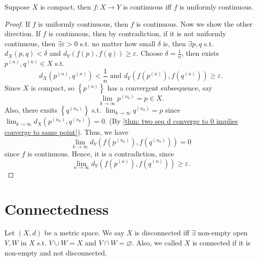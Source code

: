 \begin{theorem}
    Suppose \(X\) is compact, then \(f:X \to Y\) is continuous iff \(f\) is uniformly continuous.   
\end{theorem}
\begin{proof}
    If \(f\) is uniformly continuous, then \(f\) is continuous. Now we show the other direction. If \(f\) is continuous, then by contradiction, if it is not uniformly continuous, then \(\exists \varepsilon > 0\) s.t. no matter how small \(\delta \) is, then \(\exists p, q\) s.t. \(d_X(p, q) < \delta \) and \(d_Y(f(p), f(q)) \ge \varepsilon \). Choose \(\delta = \frac{1}{n}\), then exists \(p^{(n)}, q^{(n)} \in X\) s.t. 
    \[
        d_X \left( p^{(n)}, q^{(n)} \right) < \frac{1}{n} \text{ and } d_Y \left( f \left( p^{(n)}\right), f \left( q^{(n)}  \right)   \right) \ge \varepsilon.  
    \]  Since \(X\) is compact, so \(\left\{ p^{(n)} \right\} \) has a convergent subsequence, say 
    \[
        \lim_{k \to \infty} p^{(n_k)} = p \in X.  
    \] Also, there exsits \(\left\{ q^{(n_k)} \right\} \) s.t. \(\lim_{k \to \infty} q^{(n_k)} = p \) since \(\lim_{k \to \infty} d_X \left( p^{(n_k)}, q^{(n_k)} \right) = 0  \). (By \autoref{thm: two seq d converge to 0 implies converge to same point}). Thus, we have 
    \[
        \lim_{k \to \infty} d_Y \left( f \left( p^{(n_k)} \right) , f \left( q^{(n_k)} \right)  \right) = 0 
    \] since \(f\) is continuous. 
    Hence, it is a contradiction, since
    \[
        \lim_{n \to \infty} d_Y \left( f \left( p^{(n)} \right), f \left( q^{(n)} \right)   \right) \ge \varepsilon. 
    \]
\end{proof}

\section{Connectedness}
\begin{definition} \label{def: disconnected/connected}
    Let \((X, d)\) be a metric space. We say \(X\) is disconnected iff \(\exists \) non-empty open \(V, W\) in \(X\) s.t. \(V \cup W = X\) and \(V \cap W = \varnothing \). Also, we called \(X\) is connected if it is non-empty and not disconnected.       
\end{definition}

